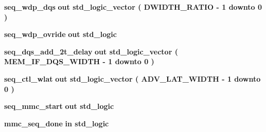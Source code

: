 \begin{DoxyCompactItemize}
\item 
{\bf seq\+\_\+wdp\+\_\+dqs}  {\bfseries {\bfseries \textcolor{keywordflow}{out}\textcolor{vhdlchar}{ }}} {\bfseries \textcolor{comment}{std\+\_\+logic\+\_\+vector}\textcolor{vhdlchar}{ }\textcolor{vhdlchar}{(}\textcolor{vhdlchar}{ }\textcolor{vhdlchar}{ }\textcolor{vhdlchar}{ }\textcolor{vhdlchar}{ }{\bfseries {\bf D\+W\+I\+D\+T\+H\+\_\+\+R\+A\+T\+IO}} \textcolor{vhdlchar}{-\/}\textcolor{vhdlchar}{ } \textcolor{vhdldigit}{1} \textcolor{vhdlchar}{ }\textcolor{keywordflow}{downto}\textcolor{vhdlchar}{ }\textcolor{vhdlchar}{ } \textcolor{vhdldigit}{0} \textcolor{vhdlchar}{ }\textcolor{vhdlchar}{)}\textcolor{vhdlchar}{ }} 
\item 
{\bf seq\+\_\+wdp\+\_\+ovride}  {\bfseries {\bfseries \textcolor{keywordflow}{out}\textcolor{vhdlchar}{ }}} {\bfseries \textcolor{comment}{std\+\_\+logic}\textcolor{vhdlchar}{ }} 
\item 
{\bf seq\+\_\+dqs\+\_\+add\+\_\+2t\+\_\+delay}  {\bfseries {\bfseries \textcolor{keywordflow}{out}\textcolor{vhdlchar}{ }}} {\bfseries \textcolor{comment}{std\+\_\+logic\+\_\+vector}\textcolor{vhdlchar}{ }\textcolor{vhdlchar}{(}\textcolor{vhdlchar}{ }\textcolor{vhdlchar}{ }\textcolor{vhdlchar}{ }\textcolor{vhdlchar}{ }{\bfseries {\bf M\+E\+M\+\_\+\+I\+F\+\_\+\+D\+Q\+S\+\_\+\+W\+I\+D\+TH}} \textcolor{vhdlchar}{-\/}\textcolor{vhdlchar}{ } \textcolor{vhdldigit}{1} \textcolor{vhdlchar}{ }\textcolor{keywordflow}{downto}\textcolor{vhdlchar}{ }\textcolor{vhdlchar}{ } \textcolor{vhdldigit}{0} \textcolor{vhdlchar}{ }\textcolor{vhdlchar}{)}\textcolor{vhdlchar}{ }} 
\item 
{\bf seq\+\_\+ctl\+\_\+wlat}  {\bfseries {\bfseries \textcolor{keywordflow}{out}\textcolor{vhdlchar}{ }}} {\bfseries \textcolor{comment}{std\+\_\+logic\+\_\+vector}\textcolor{vhdlchar}{ }\textcolor{vhdlchar}{(}\textcolor{vhdlchar}{ }\textcolor{vhdlchar}{ }\textcolor{vhdlchar}{ }\textcolor{vhdlchar}{ }{\bfseries {\bf A\+D\+V\+\_\+\+L\+A\+T\+\_\+\+W\+I\+D\+TH}} \textcolor{vhdlchar}{-\/}\textcolor{vhdlchar}{ } \textcolor{vhdldigit}{1} \textcolor{vhdlchar}{ }\textcolor{keywordflow}{downto}\textcolor{vhdlchar}{ }\textcolor{vhdlchar}{ } \textcolor{vhdldigit}{0} \textcolor{vhdlchar}{ }\textcolor{vhdlchar}{)}\textcolor{vhdlchar}{ }} 
\item 
{\bf seq\+\_\+mmc\+\_\+start}  {\bfseries {\bfseries \textcolor{keywordflow}{out}\textcolor{vhdlchar}{ }}} {\bfseries \textcolor{comment}{std\+\_\+logic}\textcolor{vhdlchar}{ }} 
\item 
{\bf mmc\+\_\+seq\+\_\+done}  {\bfseries {\bfseries \textcolor{keywordflow}{in}\textcolor{vhdlchar}{ }}} {\bfseries \textcolor{comment}{std\+\_\+logic}\textcolor{vhdlchar}{ }} 

\end{DoxyCompactItemize}
